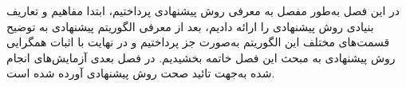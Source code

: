 در این فصل به‌طور مفصل به معرفی روش پیشنهادی پرداختیم، ابتدا مفاهیم و تعاریف بنیادی روش پیشنهادی را ارائه دادیم، بعد از معرفی الگوریتم پیشنهادی به توضیح قسمت‌های مختلف این الگوریتم به‌صورت جز پرداختیم و در نهایت با اثبات همگرایی روش پیشنهادی به مبحث این فصل خاتمه بخشیدیم. در فصل بعدی آزمایش‌های انجام شده به‌جهت تائید صحت روش پیشنهادی آورده شده است.

